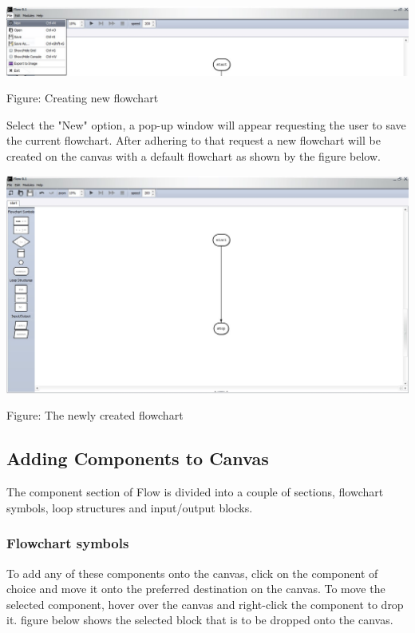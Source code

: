 \documentclass[11pt,a4paper,titlepage]{article}
\begin{document}
		\includegraphics[width=14cm]{images/Menu.jpg}
		\begin{center}
			Figure: Creating new flowchart \newline \newline
		\end{center}

 Select the "New" option, a pop-up window will appear requesting the user to save the current flowchart. After adhering to that request a new flowchart will be created on the canvas with a default flowchart as shown by the figure below.
 
 		\includegraphics[width=14cm]{images/newFlowchart.jpg}
		\begin{center}
			Figure: The newly created flowchart\newline \newline
		\end{center}
		
		
	\subsection{Adding Components to Canvas}
	
	The component section of Flow is divided into a couple of sections, flowchart symbols, loop structures and input/output blocks.
	\subsubsection{Flowchart symbols}
	
	To add any of these components onto the canvas, click on the component of choice and move it onto the preferred destination on the canvas. To move the selected component, hover over the canvas and right-click the component to drop it. figure below shows the selected block that is to be dropped onto the canvas.\\
	
\end{document}
